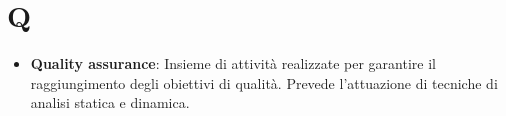 \section{Q}
\begin{itemize} 
	\item
	\textbf{Quality assurance}: Insieme di attività realizzate per garantire il raggiungimento degli obiettivi di qualità. Prevede l'attuazione di tecniche di analisi statica e dinamica.	
\end{itemize}